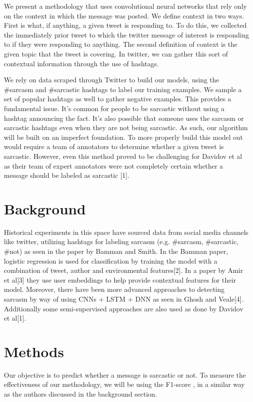 \documentclass[11pt,a4paper]{article}
\begin{document}
We present a methodology that uses convolutional neural networks that rely only on the context in which the message was posted. We define context in two ways. First is what, if anything, a given tweet is responding to. To do this, we collected the immediately prior tweet to which the twitter message of interest is responding to if they were responding to anything. The second definition of context is the given topic that the tweet is covering. In twitter, we can gather this sort of contextual information through the use of hashtags.

We rely on data scraped through Twitter to build our models, using the \#sarcasm and \#sarcastic hashtags to label our training examples. We sample a set of popular hashtags as well to gather negative examples. This provides a fundamental issue. It's common for people to be sarcastic without using a hashtag announcing the fact. It's also possible that someone uses the sarcasm or sarcastic hashtags even when they are not being sarcastic. As such, our algorithm will  be built on an imperfect foundation. To more properly build this model out would require a team of annotators to determine whether a given tweet is sarcastic. However, even this method proved to be challenging for Davidov et al as their team of expert annotators were not completely certain whether a message should be labeled as sarcastic [1].

\section{Background}

Historical experiments in this space have sourced data from social media channels like twitter, utilizing hashtags for labeling sarcasm (e.g. \#sarcasm, \#sarcastic, \#not) as seen in the paper by Bamman and Smith. In the Bamman paper, logistic regression is used for classification by training the model with a combination of tweet, author and environmental features[2].  In a paper by Amir et al[3] they use user embeddings to help provide contextual features for their model.  Moreover, there have been more advanced approaches to detecting sarcasm by way of using CNNs + LSTM + DNN as seen in Ghosh and Veale[4].  Additionally some semi-supervised approaches are also used as done by Davidov et al[1].

\section{Methods}
Our objective is to predict whether a message is sarcastic or not. To measure the effectiveness of our methodology, we will be using the  F1-score , in a similar way as the authors discussed in the background section. 
\end{document}
